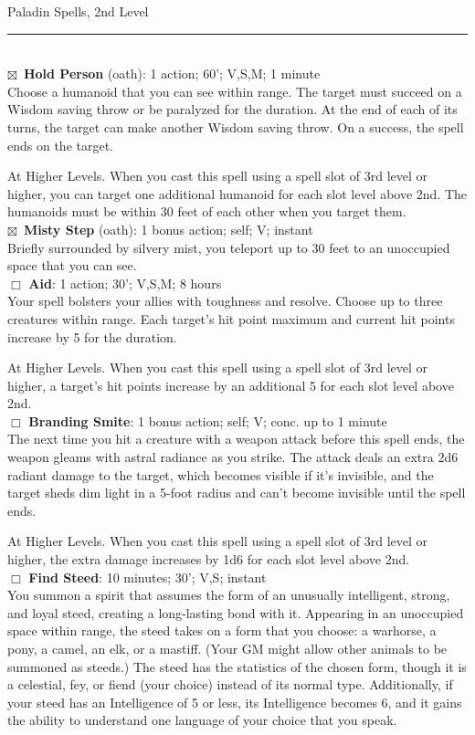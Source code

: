 \documentclass[11pt]{article}
\newcommand{\spell}[1]{{\sc\bfseries #1}}
\newcommand{\available}{{\Large $\boxtimes$}\ }
\begin{document}
{\noindent
{\Large Paladin Spells, 2nd Level}
\hrule

\mbox{ }
\\[6pt]
\available \spell{Hold Person} (oath): 1 action; 60'; V,S,M; 1 minute
\\
Choose a humanoid that you can see within range. The target must succeed on a Wisdom saving throw or be paralyzed for the duration. At the end of each of its turns, the target can make another Wisdom saving throw. On a success, the spell ends on the target.

At Higher Levels. When you cast this spell using a spell slot of 3rd
level or higher, you can target one additional humanoid for each slot
level above 2nd. The humanoids must be within 30 feet of each other
when you target them.
\\[4pt]
\available \spell{Misty Step} (oath): 1 bonus action; self; V; instant
\\
Briefly surrounded by silvery mist, you teleport up to 30 feet to an
unoccupied space that you can see.
\\[4pt]
$\Box$ \spell{Aid}: 1 action; 30'; V,S,M; 8 hours
\\
Your spell bolsters your allies with toughness and resolve. Choose up
to three creatures within range. Each target’s hit point maximum and
current hit points increase by 5 for the duration.

At Higher Levels. When you cast this spell using a spell slot of 3rd
level or higher, a target’s hit points increase by an additional 5 for
each slot level above 2nd.
\\[4pt]
$\Box$ \spell{Branding Smite}: 1 bonus action; self; V; conc. up to 1
minute
\\
The next time you hit a creature with a weapon attack before this
spell ends, the weapon gleams with astral radiance as you strike. The
attack deals an extra 2d6 radiant damage to the target, which becomes
visible if it's invisible, and the target sheds dim light in a 5-foot
radius and can't become invisible until the spell ends.

At Higher Levels. When you cast this spell using a spell slot of 3rd
level or higher, the extra damage increases by 1d6 for each slot level
above 2nd.
\\[4pt]
$\Box$ \spell{Find Steed}: 10 minutes; 30'; V,S; instant
\\
You summon a spirit that assumes the form of an unusually intelligent,
strong, and loyal steed, creating a long-lasting bond with
it. Appearing in an unoccupied space within range, the steed takes on
a form that you choose: a warhorse, a pony, a camel, an elk, or a
mastiff. (Your GM might allow other animals to be summoned as steeds.)
The steed has the statistics of the chosen form, though it is a
celestial, fey, or fiend (your choice) instead of its normal
type. Additionally, if your steed has an Intelligence of 5 or less,
its Intelligence becomes 6, and it gains the ability to understand one
language of your choice that you speak.

}
\end{document}
